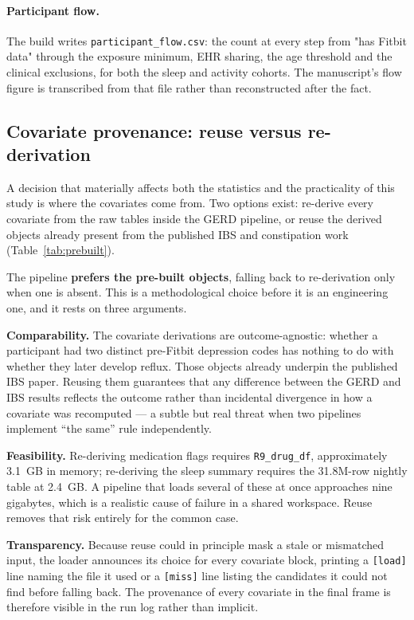 \documentclass[11pt]{article}
\newcommand{\code}[1]{\texttt{\small #1}}
\begin{document}
\paragraph{Participant flow.} The build writes \code{participant\_flow.csv}: the
count at every step from "has Fitbit data" through the exposure minimum, EHR
sharing, the age threshold and the clinical exclusions, for both the sleep and
activity cohorts. The manuscript's flow figure is transcribed from that file
rather than reconstructed after the fact.

\subsection{Covariate provenance: reuse versus re-derivation}
\label{sec:covstrategy}
A decision that materially affects both the statistics and the practicality of this study is where the
covariates come from. Two options exist: re-derive every covariate from the raw tables inside the GERD
pipeline, or reuse the derived objects already present from the published IBS and constipation work
(Table~\ref{tab:prebuilt}).

The pipeline \textbf{prefers the pre-built objects}, falling back to re-derivation only when one is
absent. This is a methodological choice before it is an engineering one, and it rests on three
arguments.

\textbf{Comparability.} The covariate derivations are outcome-agnostic: whether a participant had two
distinct pre-Fitbit depression codes has nothing to do with whether they later develop reflux. Those
objects already underpin the published IBS paper. Reusing them guarantees that any difference between
the GERD and IBS results reflects the outcome rather than incidental divergence in how a covariate was
recomputed --- a subtle but real threat when two pipelines implement ``the same'' rule independently.

\textbf{Feasibility.} Re-deriving medication flags requires \code{R9_drug_df}, approximately 3.1~GB in
memory; re-deriving the sleep summary requires the 31.8M-row nightly table at 2.4~GB. A pipeline that
loads several of these at once approaches nine gigabytes, which is a realistic cause of failure in a
shared workspace. Reuse removes that risk entirely for the common case.

\textbf{Transparency.} Because reuse could in principle mask a stale or mismatched input, the loader
announces its choice for every covariate block, printing a \code{[load]} line naming the file it used
or a \code{[miss]} line listing the candidates it could not find before falling back. The provenance
of every covariate in the final frame is therefore visible in the run log rather than implicit.
\end{document}
